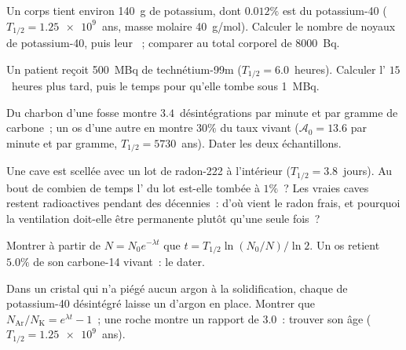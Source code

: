 \begin{exercise}[$\star\star$]\label{exo:g12:radioactive-decay:8}
Un corps tient environ \qty{140}{g} de potassium, dont $0.012\%$ est
du potassium-40 ($T_{1/2} = \num{1.25e9}$~ans, masse molaire
\qty{40}{g/mol}). Calculer le nombre de noyaux de potassium-40, puis
leur ~; comparer au total corporel de
\qty{8000}{Bq}.
\end{exercise}

\begin{exercise}[$\star\star$]\label{exo:g12:radioactive-decay:9}
Un patient reçoit \qty{500}{MBq} de technétium-99m
($T_{1/2} = 6.0$~heures). Calculer
l' $15$~heures plus tard, puis le
temps pour qu'elle tombe sous \qty{1}{MBq}.
\end{exercise}

\begin{exercise}[$\star\star$]\label{exo:g12:radioactive-decay:10}
Du charbon d'une fosse montre $3.4$~désintégrations par minute et par
gramme de carbone~; un os d'une autre en montre $30\%$ du taux vivant
($\mathcal A_0 = 13.6$ par minute et par gramme,
$T_{1/2} = \num{5730}$~ans). Dater les deux échantillons.
\end{exercise}

\begin{exercise}[$\star\star$]\label{exo:g12:radioactive-decay:11}
Une cave est scellée avec un lot de radon-222 à l'intérieur
($T_{1/2} = 3.8$~jours). Au bout de combien de temps
l' du lot est-elle tombée à
$1\%$~? Les vraies caves restent radioactives pendant des décennies~:
d'où vient le radon frais, et pourquoi la ventilation doit-elle être
permanente plutôt qu'une seule fois~?
\end{exercise}

\begin{exercise}[$\star\star\star$]\label{exo:g12:radioactive-decay:12}
Montrer à partir de $N = N_0 e^{-\lambda t}$ que
$t = T_{1/2}\ln(N_0/N)/\ln 2$. Un os retient $5.0\%$ de son
carbone-14 vivant~: le dater.
\end{exercise}

\begin{exercise}[$\star\star\star$]\label{exo:g12:radioactive-decay:13}
Dans un cristal qui n'a piégé aucun argon à la solidification, chaque
 de potassium-40 désintégré laisse un
 d'argon en place. Montrer que
$N_{\mathrm{Ar}}/N_{\mathrm K} = e^{\lambda t} - 1$~; une roche
montre un rapport de $3.0$~: trouver son âge
($T_{1/2} = \num{1.25e9}$~ans).
\end{exercise}

